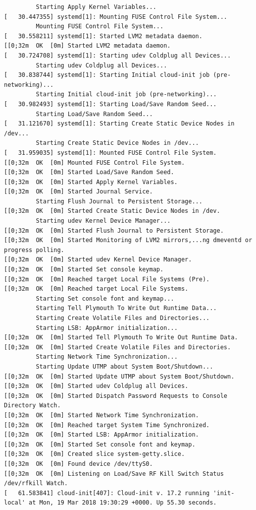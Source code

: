 \documentclass[12pt]{article}
\begin{document}
\begin{verbatim}
         Starting Apply Kernel Variables...
[   30.447355] systemd[1]: Mounting FUSE Control File System...
         Mounting FUSE Control File System...
[   30.558211] systemd[1]: Started LVM2 metadata daemon.
[[0;32m  OK  [0m] Started LVM2 metadata daemon.
[   30.724708] systemd[1]: Starting udev Coldplug all Devices...
         Starting udev Coldplug all Devices...
[   30.838744] systemd[1]: Starting Initial cloud-init job (pre-networking)...
         Starting Initial cloud-init job (pre-networking)...
[   30.982493] systemd[1]: Starting Load/Save Random Seed...
         Starting Load/Save Random Seed...
[   31.121670] systemd[1]: Starting Create Static Device Nodes in /dev...
         Starting Create Static Device Nodes in /dev...
[   31.959035] systemd[1]: Mounted FUSE Control File System.
[[0;32m  OK  [0m] Mounted FUSE Control File System.
[[0;32m  OK  [0m] Started Load/Save Random Seed.
[[0;32m  OK  [0m] Started Apply Kernel Variables.
[[0;32m  OK  [0m] Started Journal Service.
         Starting Flush Journal to Persistent Storage...
[[0;32m  OK  [0m] Started Create Static Device Nodes in /dev.
         Starting udev Kernel Device Manager...
[[0;32m  OK  [0m] Started Flush Journal to Persistent Storage.
[[0;32m  OK  [0m] Started Monitoring of LVM2 mirrors,...ng dmeventd or progress polling.
[[0;32m  OK  [0m] Started udev Kernel Device Manager.
[[0;32m  OK  [0m] Started Set console keymap.
[[0;32m  OK  [0m] Reached target Local File Systems (Pre).
[[0;32m  OK  [0m] Reached target Local File Systems.
         Starting Set console font and keymap...
         Starting Tell Plymouth To Write Out Runtime Data...
         Starting Create Volatile Files and Directories...
         Starting LSB: AppArmor initialization...
[[0;32m  OK  [0m] Started Tell Plymouth To Write Out Runtime Data.
[[0;32m  OK  [0m] Started Create Volatile Files and Directories.
         Starting Network Time Synchronization...
         Starting Update UTMP about System Boot/Shutdown...
[[0;32m  OK  [0m] Started Update UTMP about System Boot/Shutdown.
[[0;32m  OK  [0m] Started udev Coldplug all Devices.
[[0;32m  OK  [0m] Started Dispatch Password Requests to Console Directory Watch.
[[0;32m  OK  [0m] Started Network Time Synchronization.
[[0;32m  OK  [0m] Reached target System Time Synchronized.
[[0;32m  OK  [0m] Started LSB: AppArmor initialization.
[[0;32m  OK  [0m] Started Set console font and keymap.
[[0;32m  OK  [0m] Created slice system-getty.slice.
[[0;32m  OK  [0m] Found device /dev/ttyS0.
[[0;32m  OK  [0m] Listening on Load/Save RF Kill Switch Status /dev/rfkill Watch.
[   61.583841] cloud-init[407]: Cloud-init v. 17.2 running 'init-local' at Mon, 19 Mar 2018 19:30:29 +0000. Up 55.30 seconds.

\end{verbatim}
\end{document}
